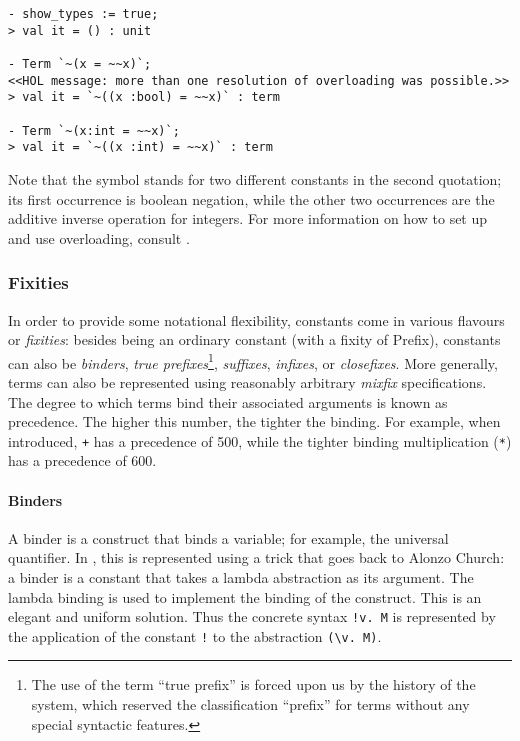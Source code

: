 {\begin{session}
\begin{verbatim}
- show_types := true;
> val it = () : unit

- Term `~(x = ~~x)`;
<<HOL message: more than one resolution of overloading was possible.>>
> val it = `~((x :bool) = ~~x)` : term

- Term `~(x:int = ~~x)`;
> val it = `~((x :int) = ~~x)` : term
\end{verbatim}
\end{session}

Note that the symbol \holtxt{\~{}} stands for two different constants in
the second quotation; its first occurrence is boolean negation, while
the other two occurrences are the additive inverse operation for integers.
For more information on how to set up and use overloading, consult
\REFERENCE.

\subsubsection{Fixities}

In order to provide some notational flexibility, constants come in
various flavours or {\it fixities}: besides being an ordinary constant
(with a fixity of {\sf Prefix}), constants can also be {\it binders},
{\it true prefixes}\footnote{The use of the term ``true prefix'' is
forced upon us by the history of the system, which reserved the
classification ``prefix'' for terms without any special syntactic
features.}, {\it suffixes}, {\it infixes}, or {\it closefixes}.  More
generally, terms can also be represented using reasonably arbitrary
{\it mixfix} specifications.  The degree to which terms bind their
associated arguments is known as precedence.  The higher this number,
the tighter the binding.  For example, when introduced, \verb-+- has a
precedence of 500, while the tighter binding multiplication (\verb+*+)
has a precedence of 600.

\paragraph{Binders}

A binder is a construct that binds a variable; for example, the
universal quantifier. In \HOL, this is represented using a trick that
goes back to Alonzo Church: a binder is a constant that takes a lambda
abstraction as its argument. The lambda binding is used to implement
the binding of the construct. This is an elegant and uniform solution.
Thus the concrete syntax \verb+!v. M+ is represented by the
application of the constant \verb+!+ to the abstraction \verb+(\v. M)+.

}
